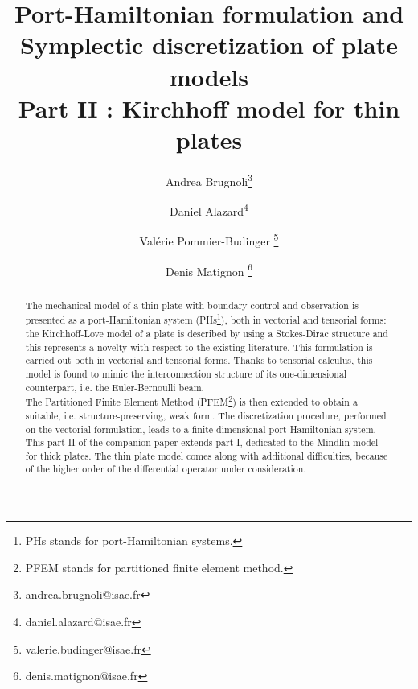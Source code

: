 \documentclass[11pt]{article}
\title{Port-Hamiltonian formulation and \\ Symplectic discretization of plate models\\
	\Large{Part II : Kirchhoff model for thin plates}}
\author[1]{Andrea Brugnoli\thanks{andrea.brugnoli@isae.fr}}
\author[1]{Daniel Alazard\thanks{daniel.alazard@isae.fr}}
\author[1]{Val\'erie Pommier-Budinger \thanks{valerie.budinger@isae.fr}}
\author[1]{Denis Matignon \thanks{denis.matignon@isae.fr}}
\affil[1]{ISAE-SUPAERO, Universit\'e de Toulouse, France. \\
	10 Avenue Edouard Belin, BP-54032, 31055 Toulouse Cedex 4.}
\begin{document}
\maketitle
\begin{abstract}
	The mechanical model of a thin plate with boundary control and 
	observation is presented as a port-Hamiltonian system (PHs\footnote{PHs stands for port-Hamiltonian systems.}), both in vectorial and tensorial forms: the Kirchhoff-Love model of a plate is described by using a Stokes-Dirac structure and this represents a novelty with respect to the existing literature. This formulation is carried out both in vectorial and tensorial forms. Thanks to tensorial calculus, this model is found to mimic the interconnection structure of its one-dimensional counterpart, i.e. the Euler-Bernoulli beam. \\
	The Partitioned Finite Element Method (PFEM\footnote{PFEM stands for partitioned finite element method.}) is then extended to obtain a suitable, i.e. structure-preserving, weak form. The discretization procedure, performed on the vectorial formulation, leads to a finite-dimensional port-Hamiltonian system.  This part II of the companion paper extends part I, dedicated to the Mindlin model for thick plates. The thin plate model comes along with additional difficulties, because of the higher order of the differential operator under consideration.
\end{abstract}
	
\end{document}

